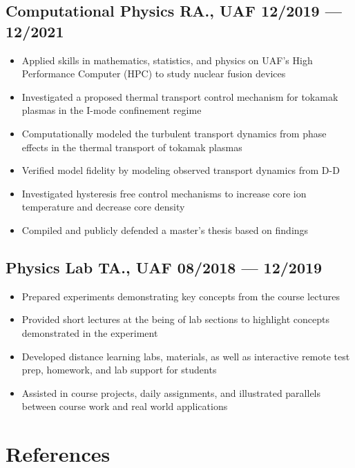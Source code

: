 \documentclass[letterpaper,11pt]{article}
\begin{document}
\subsection*{{\color{cvblue}Computational Physics RA., UAF } \hfill 12/2019 --- 12/2021} 
    \begin{itemize}
    \setlength{\itemsep}{-.5pt}
    \item Applied skills in mathematics, statistics, and physics on UAF's High Performance Computer (HPC) to study nuclear fusion devices  
    \item Investigated a proposed thermal transport control mechanism for tokamak plasmas in the I-mode confinement regime 
    \item Computationally modeled the turbulent transport dynamics from phase effects in the thermal transport of tokamak plasmas
    \item Verified model fidelity by modeling observed transport dynamics from D-D
    \item Investigated hysteresis free control mechanisms to increase core ion temperature and decrease core density 
    \item Compiled and publicly defended a master's thesis based on findings
\end{itemize}


\subsection*{{\color{cvblue} Physics Lab TA., UAF } \hfill 08/2018 --- 12/2019} 
\begin{itemize}
    \setlength{\itemsep}{-.5pt}
    \item Prepared experiments demonstrating key concepts from the course lectures
    \item Provided short lectures at the being of lab sections to highlight concepts demonstrated in the experiment
    \item Developed distance learning labs, materials, as well as interactive remote test prep, homework, and lab support for students
    \item Assisted in course projects, daily assignments, and illustrated parallels between course work and real world applications
\end{itemize}

\section*{\color{cvblue}References} 
\end{document}

